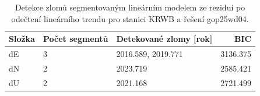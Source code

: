 \begin{table}[htbp]
\caption{Detekce zlomů segmentovaným lineárním modelem ze reziduí po odečtení lineárního trendu pro stanici KRWB a řešení gop25wd04.}
\label{tab:gop25wd04_stcd_krwb_detr_weighted_1seg_jumps_piecewise_bic}
\begin{tabular}{lllr}
\toprule
Složka & Počet segmentů & Detekované zlomy [rok] & BIC \\
\midrule
dE & 3 & 2016.589, 2019.771 & 3136.375 \\
dN & 2 & 2023.719 & 2585.421 \\
dU & 2 & 2021.168 & 2721.499 \\
\bottomrule
\end{tabular}
\end{table}
